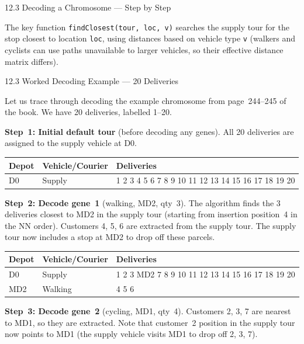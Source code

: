 \documentclass[aspectratio=169,10pt]{beamer}
\begin{document}
\begin{frame}[allowframebreaks]{12.3 Decoding a Chromosome --- Step by Step}
\medskip

The key function \texttt{findClosest(tour, loc, v)} searches the supply
tour for the stop closest to location \texttt{loc}, using distances
based on vehicle type \texttt{v} (walkers and cyclists can use paths
unavailable to larger vehicles, so their effective distance matrix differs).

\end{frame}

\begin{frame}[allowframebreaks]{12.3 Worked Decoding Example --- 20 Deliveries}

Let us trace through decoding the example chromosome from page~244--245
of the book.
We have 20 deliveries, labelled 1--20.

\medskip

\textbf{Step~1: Initial default tour} (before decoding any genes).
All 20 deliveries are assigned to the supply vehicle at D0.

\begin{center}
  \begin{tabular}{lll}
    \toprule
    Depot & Vehicle/Courier & Deliveries \\
    \midrule
    D0 & Supply & 1 2 3 4 5 6 7 8 9 10 11 12 13 14 15 16 17 18 19 20 \\
    \bottomrule
  \end{tabular}
\end{center}

\medskip

\textbf{Step~2: Decode gene~1} (walking, MD2, qty~3).
The algorithm finds the 3 deliveries closest to MD2 in the supply tour
(starting from insertion position~4 in the NN order).
Customers 4, 5, 6 are extracted from the supply tour.
The supply tour now includes a stop at MD2 to drop off these parcels.

\begin{center}
  \begin{tabular}{lll}
    \toprule
    Depot & Vehicle/Courier & Deliveries \\
    \midrule
    D0  & Supply  & 1 2 3 MD2 7 8 9 10 11 12 13 14 15 16 17 18 19 20 \\
    MD2 & Walking & 4 5 6 \\
    \bottomrule
  \end{tabular}
\end{center}

\textbf{Step~3: Decode gene~2} (cycling, MD1, qty~4).
Customers 2, 3, 7 are nearest to MD1, so they are extracted.
Note that customer~2 position in the supply tour now points to MD1
(the supply vehicle visits MD1 to drop off 2, 3, 7).


\end{frame}
\end{document}
